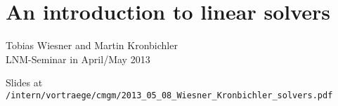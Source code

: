 \chapter{An introduction to linear solvers} 

\begin{center}
{\LARGE{Tobias Wiesner and Martin Kronbichler}}\bigskip\\
{\normalsize{LNM-Seminar in April/May 2013}}\bigskip\\
\end{center}

{\noindent\large Slides at\\
\texttt{/intern/vortraege/cmgm/2013\_05\_08\_Wiesner\_Kronbichler\_solvers.pdf}}
